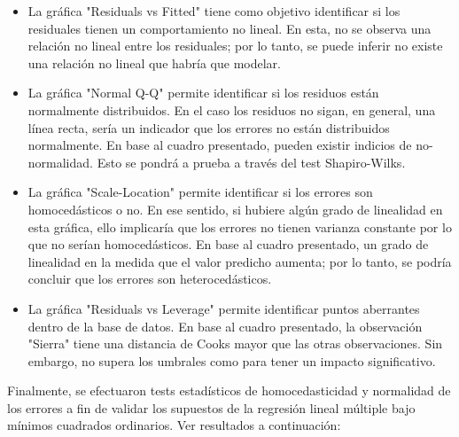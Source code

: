 \documentclass[10pt,a4paper]{article}\usepackage[]{graphicx}\usepackage[]{color}
\begin{document}
\begin{itemize}
  \item La gráfica "Residuals vs Fitted" tiene como objetivo identificar si los residuales tienen un comportamiento no lineal. En esta, no se observa una relación no lineal entre los residuales; por lo tanto, se puede inferir no existe una relación no lineal que habría que modelar.
  \item La gráfica "Normal Q-Q" permite identificar si los residuos están normalmente distribuidos. En el caso los residuos no sigan, en general, una línea recta, sería un indicador que los errores no están distribuidos normalmente. En base al cuadro presentado, pueden existir indicios de no-normalidad. Esto se pondrá a prueba a través del test Shapiro-Wilks.
  \item La gráfica "Scale-Location" permite identificar si los errores son homocedásticos o no. En ese sentido, si hubiere algún grado de linealidad en esta gráfica, ello implicaría que los errores no tienen varianza constante por lo que no serían homocedásticos. En base al cuadro presentado, un grado de linealidad en la medida que el valor predicho aumenta; por lo tanto, se podría concluir que los errores son heterocedásticos.
  \item La gráfica "Residuals vs Leverage" permite identificar puntos aberrantes dentro de la base de datos. En base al cuadro presentado, la observación "Sierra" tiene una distancia de Cooks mayor que las otras observaciones. Sin embargo, no supera los umbrales como para tener un impacto significativo.
\end{itemize}

Finalmente, se efectuaron tests estadísticos de homocedasticidad y normalidad de los errores a fin de validar los supuestos de la regresión lineal múltiple bajo mínimos cuadrados ordinarios. Ver resultados a continuación:
\end{document}
